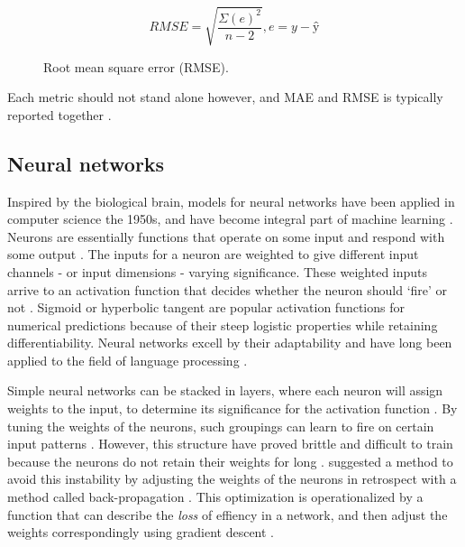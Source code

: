 \documentclass[a4paper]{article}
\begin{document}
\begin{figure}
\[ RMSE = \sqrt{\frac{\Sigma (e)^{2}}{n - 2}}, e = y - ŷ \]
\caption{Root mean square error (RMSE).}
\label{fig:rmse}
\end{figure}

Each metric should not stand alone however, and MAE and RMSE is typically
reported together \citep{Chai2014}.

\subsection{Neural networks}
Inspired by the biological brain, models for neural networks have been applied
in computer science the 1950s, and have become integral part of machine learning
 \citep{NILSSON2009, Russell2009}.
Neurons are essentially functions that operate on some input and respond with
some output \citep{Russell2009}. The inputs for a neuron are weighted to give
different input channels - or input dimensions - varying significance. These
weighted inputs arrive to an activation function that decides whether the
neuron should ‘fire’ or not \citep{NILSSON2009}. Sigmoid or hyperbolic tangent
are popular
activation functions for numerical predictions because of their steep logistic
properties while retaining differentiability. Neural networks excell by their
adaptability and have long been applied to the field of language processing
\citep{Jurafsky2000}.

Simple neural networks can be stacked in layers, where each neuron will assign
weights to the input, to determine its significance for the activation function
\citep{NILSSON2009}. By tuning the weights of the neurons, such groupings can
learn to fire on certain input patterns \citep{Russell2009}. However,
this structure have proved brittle and difficult to train because the
neurons do not retain their weights for long \citep{NILSSON2009, Russell2009}.
\cite{Rumelhart1988} suggested a method to avoid this instability by adjusting
the weights of the neurons in retrospect with a method called back-propagation
\citep{Rumelhart1988, NILSSON2009}. This optimization is
operationalized by a function that can describe the \textit{loss} of effiency
in a network, and then adjust the weights correspondingly using gradient
descent \citep{Russell2009}.
\end{document}

